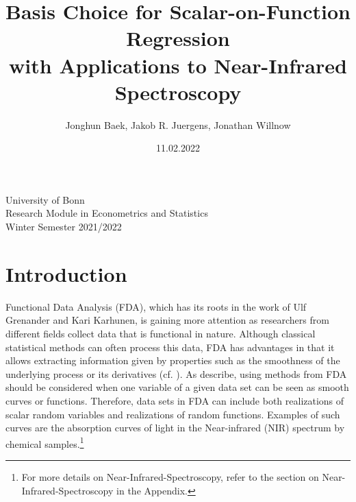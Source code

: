 \documentclass[11pt,twoside,a4paper]{article}
\begin{document}
	\title{{\LARGE Basis Choice for Scalar-on-Function Regression \\ with Applications to Near-Infrared Spectroscopy}}
	\author{Jonghun Baek, Jakob R. Juergens, Jonathan Willnow}
	\date{11.02.2022}
	\maketitle
	\vspace{1.5 cm}
	\begin{center}
		University of Bonn \\
		Research Module in Econometrics and Statistics \\
		Winter Semester 2021/2022
	\end{center}
	
	\newpage
	
	\tableofcontents
	
	\newpage
	

	\section{Introduction}
		
	Functional Data Analysis (FDA), which has its roots in the work of Ulf Grenander and Kari Karhunen, is gaining more attention as researchers from different fields collect data that is functional in nature. Although classical statistical methods can often process this data, FDA has advantages in that it allows extracting information given by properties such as the smoothness of the underlying process or its derivatives (cf. \cite{levitin_introduction_2007}).	As \cite{kokoszka_introduction_2017} describe, using methods from FDA should be considered when one variable of a given data set can be seen as smooth curves or functions.	 
	Therefore, data sets in FDA can include both realizations of scalar random variables and realizations of random functions. Examples of such curves are the absorption curves of light in the Near-infrared (NIR) spectrum by chemical samples.\footnote{For more details on Near-Infrared-Spectroscopy, refer to the section on Near-Infrared-Spectroscopy in the Appendix.}
	
\end{document}
